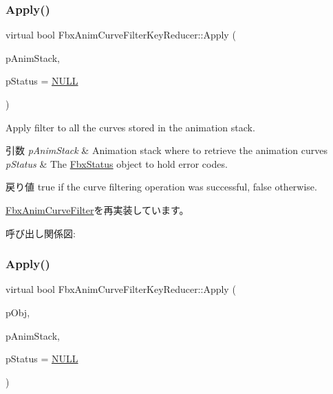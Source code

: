 \subsubsection{\texorpdfstring{Apply()}{Apply()}\hspace{0.1cm}{\footnotesize\ttfamily [1/5]}}
{\footnotesize\ttfamily virtual bool Fbx\+Anim\+Curve\+Filter\+Key\+Reducer\+::\+Apply (\begin{DoxyParamCaption}\item[{\hyperlink{class_fbx_anim_stack}{Fbx\+Anim\+Stack} $\ast$}]{p\+Anim\+Stack,  }\item[{\hyperlink{class_fbx_status}{Fbx\+Status} $\ast$}]{p\+Status = {\ttfamily \hyperlink{fbxarch_8h_a070d2ce7b6bb7e5c05602aa8c308d0c4}{N\+U\+LL}} }\end{DoxyParamCaption})\hspace{0.3cm}{\ttfamily [virtual]}}

Apply filter to all the curves stored in the animation stack. 
\begin{DoxyParams}{引数}
{\em p\+Anim\+Stack} & Animation stack where to retrieve the animation curves \\
\hline
{\em p\+Status} & The \hyperlink{class_fbx_status}{Fbx\+Status} object to hold error codes. \\
\hline
\end{DoxyParams}
\begin{DoxyReturn}{戻り値}
{\ttfamily true} if the curve filtering operation was successful, {\ttfamily false} otherwise. 
\end{DoxyReturn}


\hyperlink{class_fbx_anim_curve_filter_aef3900e6180e05661c27ee484ae939c3}{Fbx\+Anim\+Curve\+Filter}を再実装しています。

呼び出し関係図\+:
\mbox{\label{class_fbx_anim_curve_filter_key_reducer_ac9cd8a32e87c1589d0f245be377a3da3}} 
\subsubsection{\texorpdfstring{Apply()}{Apply()}\hspace{0.1cm}{\footnotesize\ttfamily [2/5]}}
{\footnotesize\ttfamily virtual bool Fbx\+Anim\+Curve\+Filter\+Key\+Reducer\+::\+Apply (\begin{DoxyParamCaption}\item[{\hyperlink{class_fbx_object}{Fbx\+Object} $\ast$}]{p\+Obj,  }\item[{\hyperlink{class_fbx_anim_stack}{Fbx\+Anim\+Stack} $\ast$}]{p\+Anim\+Stack,  }\item[{\hyperlink{class_fbx_status}{Fbx\+Status} $\ast$}]{p\+Status = {\ttfamily \hyperlink{fbxarch_8h_a070d2ce7b6bb7e5c05602aa8c308d0c4}{N\+U\+LL}} }\end{DoxyParamCaption})\hspace{0.3cm}{\ttfamily [virtual]}}


